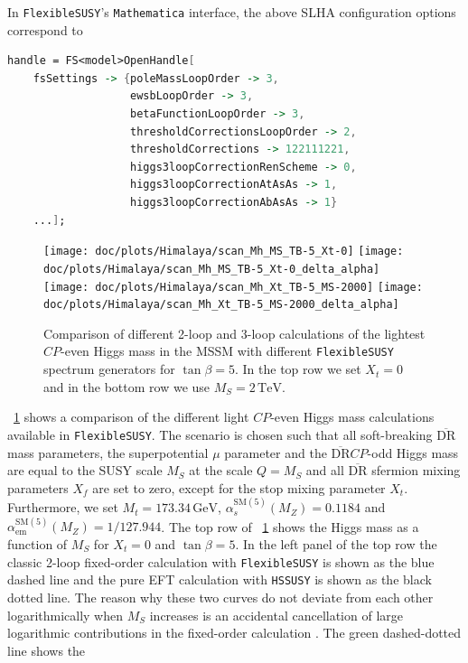 \documentclass[final,3p,11pt,pdflatex]{elsarticle}
\makeatletter
\newcommand{\modelname}[1]{\texttt{#1}\@\xspace}
\newcommand{\fs}{\texttt{FlexibleSUSY}\@\xspace}
\newcommand{\HSSUSY}{\modelname{HSSUSY}}
\newcommand{\mathematica}{\texttt{Ma\-the\-ma\-ti\-ca}\xspace}
\newcommand{\ol}[1]{\overline{#1}}
\newcommand{\DRbar}{\ensuremath{\ol{\text{DR}}}\xspace}
\newcommand{\unit}[1]{\,\text{#1}}      %
\newcommand{\SM}{\ensuremath{\text{SM}}\xspace}
\newcommand{\MS}{\ensuremath{M_S}\xspace}
\newcommand{\figref}[1]{\figurename~\ref{#1}}
\newcommand{\CP}{\ensuremath{CP}\xspace}
\def\as{\alpha_s}
\def\aem{\alpha_{\text{em}}}
\makeatother
\begin{document}
%
In \fs's \mathematica interface, the above SLHA configuration options
correspond to
%
\begin{lstlisting}[language=Mathematica]
handle = FS<model>OpenHandle[
    fsSettings -> {poleMassLoopOrder -> 3,
                   ewsbLoopOrder -> 3,
                   betaFunctionLoopOrder -> 3,
                   thresholdCorrectionsLoopOrder -> 2,
                   thresholdCorrections -> 122111221,
                   higgs3loopCorrectionRenScheme -> 0,
                   higgs3loopCorrectionAtAsAs -> 1,
                   higgs3loopCorrectionAbAsAs -> 1}
    ...];
\end{lstlisting}

\begin{figure}[h!]
  \centering
  \texttt{[image: doc/plots/Himalaya/scan\_Mh\_MS\_TB-5\_Xt-0]}\hfill
  \texttt{[image: doc/plots/Himalaya/scan\_Mh\_MS\_TB-5\_Xt-0\_delta\_alpha]}\\
  \texttt{[image: doc/plots/Himalaya/scan\_Mh\_Xt\_TB-5\_MS-2000]}\hfill
  \texttt{[image: doc/plots/Himalaya/scan\_Mh\_Xt\_TB-5\_MS-2000\_delta\_alpha]}
  \caption{Comparison of different 2-loop and 3-loop calculations of
    the lightest \CP-even Higgs mass in the MSSM with different \fs
    spectrum generators for $\tan\beta = 5$.  In the top row we set
    $X_t = 0$ and in the bottom row we use $\MS = 2\unit{TeV}$.}
  \label{fig:Mh-himalaya}
\end{figure}
%
\figref{fig:Mh-himalaya} shows a comparison of the different light
\CP-even Higgs mass calculations available in \fs.  The scenario is
chosen such that all soft-breaking \DRbar mass parameters, the
superpotential
$\mu$ parameter and the \DRbar \CP-odd Higgs mass are equal to the SUSY
scale $\MS$ at the scale $Q =
\MS$ and all \DRbar sfermion mixing parameters
$X_f$ are set to zero, except for the stop mixing parameter
$X_t$.  Furthermore, we set $M_t =
173.34\unit{GeV}$, $\as^{\SM(5)}(M_Z) =
0.1184$ and $\aem^{\SM(5)}(M_Z) =
1/127.944$.  The top row of \figref{fig:Mh-himalaya} shows the Higgs
mass as a function of $\MS$ for $X_t = 0$ and $\tan\beta =
5$.  In the left panel of the top row the classic 2-loop fixed-order
calculation with \fs \cite{Athron:2014yba} is shown as the blue dashed
line and the pure EFT calculation with \HSSUSY is shown as the black
dotted line.  The reason why these two curves do not deviate from each
other logarithmically when
$\MS$ increases is an accidental cancellation of large
logarithmic contributions in the fixed-order calculation
\cite{Athron:2016fuq}.  The green dashed-dotted line shows the
\end{document}
